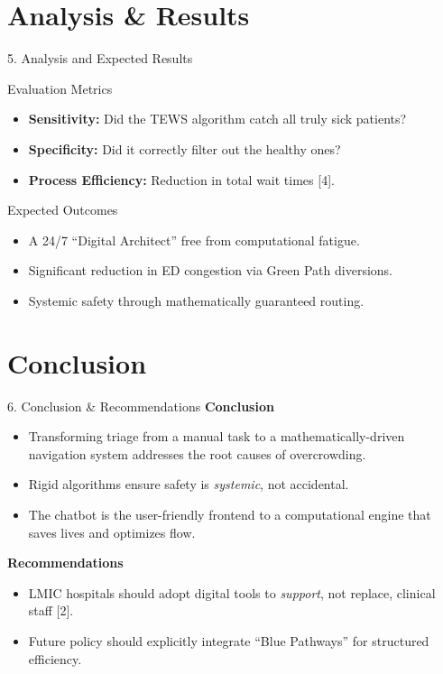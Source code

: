 \documentclass[11pt, aspectratio=169]{beamer}
\begin{document}
	\section{Analysis \& Results}
	\begin{frame}{5. Analysis and Expected Results}
		\begin{block}{Evaluation Metrics}
			\begin{itemize}
				\item \textbf{Sensitivity:} Did the TEWS algorithm catch all truly sick patients?
				\item \textbf{Specificity:} Did it correctly filter out the healthy ones?
				\item \textbf{Process Efficiency:} Reduction in total wait times [4].
			\end{itemize}
		\end{block}
		
		\begin{block}{Expected Outcomes}
			\begin{itemize}
				\item A 24/7 ``Digital Architect'' free from computational fatigue.
				\item Significant reduction in ED congestion via Green Path diversions.
				\item Systemic safety through mathematically guaranteed routing.
			\end{itemize}
		\end{block}
	\end{frame}
	
	\section{Conclusion}
	\begin{frame}{6. Conclusion \& Recommendations}
		\textbf{Conclusion}
		\begin{itemize}
			\item Transforming triage from a manual task to a mathematically-driven navigation system addresses the root causes of overcrowding.
			\item Rigid algorithms ensure safety is \textit{systemic}, not accidental.
			\item The chatbot is the user-friendly frontend to a computational engine that saves lives and optimizes flow.
		\end{itemize}
		\vspace{0.3cm}
		\textbf{Recommendations}
		\begin{itemize}
			\item LMIC hospitals should adopt digital tools to \textit{support}, not replace, clinical staff [2].
			\item Future policy should explicitly integrate ``Blue Pathways'' for structured efficiency.
		\end{itemize}
	\end{frame}
	
\end{document}
